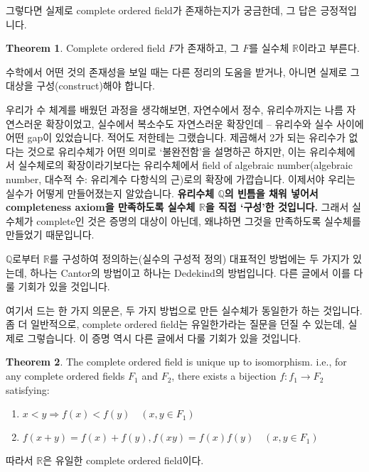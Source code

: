 \documentclass[12pt]{article}
\theoremstyle{definition}
\newtheorem{thm}{Theorem}[section]
\def\QQ{\mathbb{Q}}
\def\RR{\mathbb{R}}
\begin{document}
그렇다면 실제로 complete ordered field가 존재하는지가 궁금한데, 그 답은 긍정적입니다.

	\begin{thm}
		Complete ordered field \(F\)가 존재하고, 그 \(F\)를 실수체 \(\RR\)이라고 부른다.
	\end{thm}

수학에서 어떤 것의 존재성을 보일 때는 다른 정리의 도움을 받거나, 아니면 실제로 그 대상을 구성(construct)해야 합니다.

우리가 수 체계를 배웠던 과정을 생각해보면, 자연수에서 정수, 유리수까지는 나름 자연스러운 확장이었고, 실수에서 복소수도 자연스러운 확장인데 – 유리수와 실수 사이에 어떤 gap이 있었습니다. 적어도 저한테는 그랬습니다. 제곱해서 2가 되는 유리수가 없다는 것으로 유리수체가 어떤 의미로 ‘불완전함’을 설명하곤 하지만, 이는 유리수체에서 실수체로의 확장이라기보다는 유리수체에서 field of algebraic number(algebraic number, 대수적 수: 유리계수 다항식의 근)로의 확장에 가깝습니다. 이제서야 우리는 실수가 어떻게 만들어졌는지 알았습니다. \textbf{유리수체 \(\QQ\)의 빈틈을 채워 넣어서 completeness axiom을 만족하도록 실수체 \(\RR\)을 직접 ‘구성’한 것입니다.} 그래서 실수체가 complete인 것은 증명의 대상이 아닌데, 왜냐하면 그것을 만족하도록 실수체를 만들었기 때문입니다.

\(\QQ\)로부터 \(\RR\)를 구성하여 정의하는(실수의 구성적 정의) 대표적인 방법에는 두 가지가 있는데, 하나는 Cantor의 방법이고 하나는 Dedekind의 방법입니다. 다른 글에서 이를 다룰 기회가 있을 것입니다.

여기서 드는 한 가지 의문은, 두 가지 방법으로 만든 실수체가 동일한가 하는 것입니다. 좀 더 일반적으로, complete ordered field는 유일한가라는 질문을 던질 수 있는데, 실제로 그렇습니다. 이 증명 역시 다른 글에서 다룰 기회가 있을 것입니다.

	\begin{thm}
		The complete ordered field is unique up to isomorphism. i.e., for any complete ordered fields \(F_1\) and \(F_2\), there exists a bijection \(f: f_1 \rightarrow F_2\) satisfying:
		\begin{enumerate} [label=(\alph*), leftmargin=2\parindent]
			\item
			\(x < y \Longrightarrow f(x) < f(y) \quad (x, y \in F_1)\)
			\item
			\(f(x + y) = f(x)+f(y), f(xy)=f(x)f(y) \quad (x, y \in F_1)\)
		\end{enumerate}
		따라서 \(\RR\)은 유일한 complete ordered field이다.
	\end{thm}

\newpage
\end{document}
